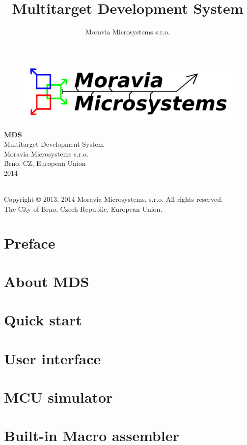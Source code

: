\documentclass[a4paper,twosided, 15pt]{book}
\title{Multitarget Development System}
\author{Moravia Microsystems s.r.o.}
\begin{document}
    \begin{titlepage}
        \begin{figure}[ht!]
            \centering{}
            \includegraphics[width=.9\textwidth]{img/Moravia_Microsystems.png}
        \end{figure}
        \begin{center}
            \fontsize{35.83pt}{60pt} \selectfont{}
            \textbf{MDS}
            \\[1cm]
            \fontsize{25pt}{30pt} \selectfont{}
            Multitarget Development System
            \\[2cm]
            \fontsize{15pt}{19pt} \selectfont{}
            Moravia Microsystems s.r.o.\\
            Brno, CZ, European Union\\
            2014
        \end{center}
    \end{titlepage}

    {
        ~\\
        Copyright \copyright{} 2013, 2014 Moravia Microsystems, s.r.o. All rights reserved.\\
        The City of Brno, Czech Republic, European Union.
    }

    \tableofcontents

    \chapter{Preface}
        

    \chapter{About MDS}
        

    \chapter{Quick start}
        

    \chapter{User interface}
        

    \chapter{MCU simulator}
        

    \chapter{Built-in Macro assembler}
        

    \printindex
\end{document}
